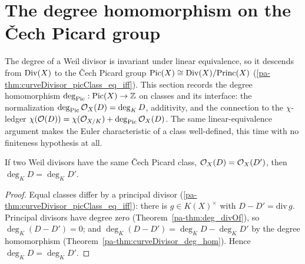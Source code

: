 \section{The degree homomorphism on the \v Cech Picard group}

The degree of a Weil divisor is invariant under linear equivalence, so it descends from
\(\operatorname{Div}(X)\) to the \v Cech Picard group \(\operatorname{Pic}(X) \cong \operatorname{Div}(X)/\mathrm{Princ}(X)\)
(\ref{pa-thm:curveDivisor_picClass_eq_iff}). This section records the degree homomorphism
\(\deg_{\operatorname{Pic}} : \operatorname{Pic}(X) \to \mathbb{Z}\) on classes and its interface: the normalization \(\deg_{\operatorname{Pic}}
\mathcal{O}_{X}(D) = \deg_K D\), additivity, and the connection to the \(\chi\)-ledger
\(\chi(\mathcal O(D)) = \chi(\mathcal{O}_{X/K}) + \deg_{\operatorname{Pic}}\mathcal{O}_{X}(D)\). The same linear-equivalence
argument makes the Euler characteristic of a class well-defined, this time with no finiteness
hypothesis at all.

\begin{lemma}
  \label{pa-lem:deg_eq_deg_of_picClass_eq}
  \leanok

  If two Weil divisors have the same \v Cech Picard class, \(\mathcal{O}_{X}(D) = \mathcal{O}_{X}(D')\), then
  \(\deg_K D = \deg_K D'\).
\end{lemma}
\begin{proof}
  \leanok
  Equal classes differ by a principal divisor (\ref{pa-thm:curveDivisor_picClass_eq_iff}): there is
  \(g \in K(X)^\times\) with \(D - D' = \mathrm{div}\, g\). Principal divisors have degree zero
  (Theorem~\ref{pa-thm:deg_divOf}), so \(\deg_K(D - D') = 0\); and \(\deg_K(D - D') = \deg_K D -
  \deg_K D'\) by the degree homomorphism (Theorem~\ref{pa-thm:curveDivisor_deg_hom}). Hence
  \(\deg_K D = \deg_K D'\).
\end{proof}

